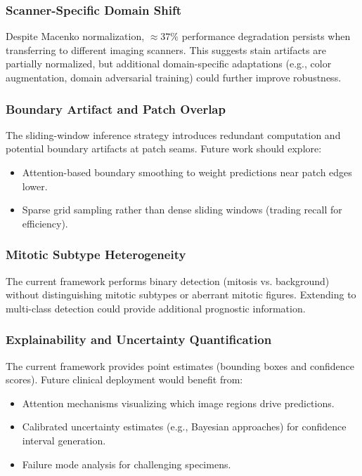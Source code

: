 \documentclass[journal]{IEEEtran}
\begin{document}
\subsubsection{Scanner-Specific Domain Shift}
Despite Macenko normalization, $\approx 37\%$ performance degradation persists when transferring to different imaging scanners. This suggests stain artifacts are partially normalized, but additional domain-specific adaptations (e.g., color augmentation, domain adversarial training) could further improve robustness.

\subsubsection{Boundary Artifact and Patch Overlap}
The sliding-window inference strategy introduces redundant computation and potential boundary artifacts at patch seams. Future work should explore:
\begin{itemize}
\item Attention-based boundary smoothing to weight predictions near patch edges lower.
\item Sparse grid sampling rather than dense sliding windows (trading recall for efficiency).
\end{itemize}

\subsubsection{Mitotic Subtype Heterogeneity}
The current framework performs binary detection (mitosis vs. background) without distinguishing mitotic subtypes or aberrant mitotic figures. Extending to multi-class detection could provide additional prognostic information.

\subsubsection{Explainability and Uncertainty Quantification}
The current framework provides point estimates (bounding boxes and confidence scores). Future clinical deployment would benefit from:
\begin{itemize}
\item Attention mechanisms visualizing which image regions drive predictions.
\item Calibrated uncertainty estimates (e.g., Bayesian approaches) for confidence interval generation.
\item Failure mode analysis for challenging specimens.
\end{itemize}
\end{document}
